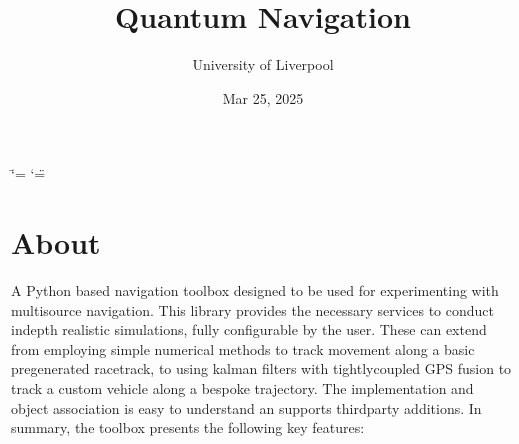 \documentclass[letterpaper,10pt,english]{sphinxmanual}
\title{Quantum Navigation}
\date{Mar 25, 2025}
\author{University of Liverpool}
\begin{document}
\ifdefined\shorthandoff
  \ifnum\catcode`\=\string=\active\shorthandoff{=}\fi
  \ifnum\catcode`\"=\active{}\fi
\fi

\pagestyle{empty}
\sphinxmaketitle
\pagestyle{plain}
\sphinxtableofcontents
\pagestyle{normal}
\label{\detokenize{index::doc}}




\chapter{About}
\label{\detokenize{index:about}}
\sphinxAtStartPar
A Python based navigation toolbox designed to be used for experimenting
with multi\sphinxhyphen{}source navigation. This library provides the necessary services
to conduct in\sphinxhyphen{}depth realistic simulations, fully configurable by the user.
These can extend from employing simple numerical methods to track movement
along a basic pre\sphinxhyphen{}generated racetrack, to using kalman filters with
tightly\sphinxhyphen{}coupled GPS fusion to track a custom vehicle along a bespoke
trajectory. The implementation and object association is easy to
understand an supports third\sphinxhyphen{}party additions. In summary, the toolbox
presents the following key features:
\end{document}
